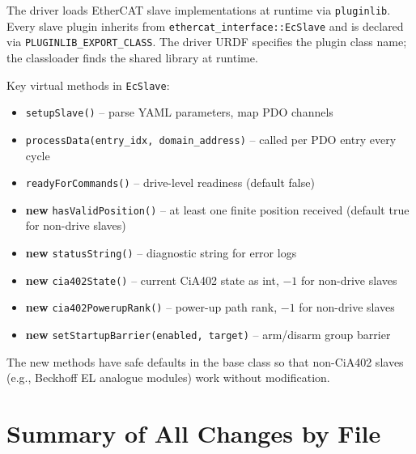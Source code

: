 \documentclass[11pt,a4paper]{article}
\begin{document}
\begin{infobox}[title=Pluginlib overview]
  The driver loads EtherCAT slave implementations at runtime via
  \texttt{pluginlib}.  Every slave plugin inherits from
  \texttt{ethercat\_interface::EcSlave} and is declared via
  \texttt{PLUGINLIB\_EXPORT\_CLASS}.  The driver URDF specifies the plugin
  class name; the classloader finds the shared library at runtime.
\end{infobox}

Key virtual methods in \texttt{EcSlave}:
\begin{itemize}[nosep]
  \item \texttt{setupSlave()} -- parse YAML parameters, map PDO channels
  \item \texttt{processData(entry\_idx, domain\_address)} -- called per PDO
        entry every cycle
  \item \texttt{readyForCommands()} -- drive-level readiness (default false)
  \item \textbf{new} \texttt{hasValidPosition()} -- at least one finite
        position received (default true for non-drive slaves)
  \item \textbf{new} \texttt{statusString()} -- diagnostic string for error logs
  \item \textbf{new} \texttt{cia402State()} -- current CiA402 state as int,
        $-1$ for non-drive slaves
  \item \textbf{new} \texttt{cia402PowerupRank()} -- power-up path rank,
        $-1$ for non-drive slaves
  \item \textbf{new} \texttt{setStartupBarrier(enabled, target)} -- arm/disarm
        group barrier
\end{itemize}

The new methods have safe defaults in the base class so that non-CiA402
slaves (e.g., Beckhoff EL analogue modules) work without modification.

\section{Summary of All Changes by File}
\label{sec:changes-by-file}
\end{document}
